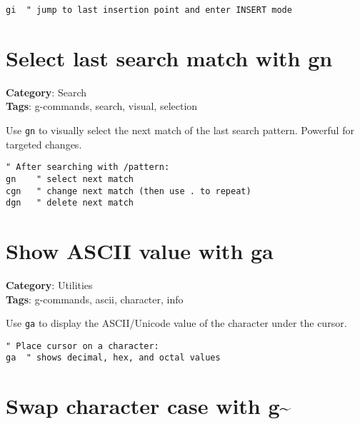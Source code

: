 {{{{{{\begin{Exa*}{}
\begin{Verbatim}[fontsize=\footnotesize, breaklines, breakanywhere]
gi  " jump to last insertion point and enter INSERT mode
\end{Verbatim}
\end{Exa*}

\section{Select last search match with gn}

\textbf{Category}: Search\\ \textbf{Tags}: g-commands, search, visual, selection
\vspace{0.5cm}

Use {\footnotesize \Verb§gn§} to visually select the next match of the last search pattern. Powerful for targeted changes.

\begin{Exa*}{}
\begin{Verbatim}[fontsize=\footnotesize, breaklines, breakanywhere]
" After searching with /pattern:
gn    " select next match
cgn   " change next match (then use . to repeat)
dgn   " delete next match
\end{Verbatim}
\end{Exa*}

\section{Show ASCII value with ga}

\textbf{Category}: Utilities\\ \textbf{Tags}: g-commands, ascii, character, info
\vspace{0.5cm}

Use {\footnotesize \Verb§ga§} to display the ASCII/Unicode value of the character under the cursor.

\begin{Exa*}{}
\begin{Verbatim}[fontsize=\footnotesize, breaklines, breakanywhere]
" Place cursor on a character:
ga  " shows decimal, hex, and octal values
\end{Verbatim}
\end{Exa*}

\section{Swap character case with g\textasciitilde{}}

}}}}}}
